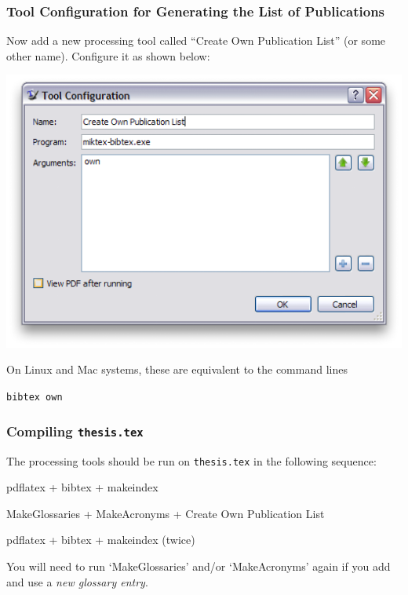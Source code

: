\documentclass[a4paper,12pt]{scrartcl}
\begin{document}
\subsubsection{Tool Configuration for Generating the List of Publications}
Now add a new processing tool called ``\textsf{Create Own Publication List}'' (or some other name). Configure it as shown below:

\includegraphics[width=.9\textwidth]{texworks-win_ownpub}


On Linux and Mac systems, these are equivalent to the command lines

\medskip

\hspace{1em}\texttt{bibtex own}


\subsubsection{Compiling \texttt{thesis.tex}}
The processing tools should be run on \texttt{thesis.tex} in the following sequence:
\begin{compactenum}
\item pdflatex + bibtex + makeindex
\item MakeGlossaries + MakeAcronyms + Create Own Publication List
\item pdflatex + bibtex + makeindex (twice)
\end{compactenum}

You will need to run `\textsf{MakeGlossaries}' and/or `\textsf{MakeAcronyms}' again if you add and use a \emph{new glossary entry}.

\end{document}
